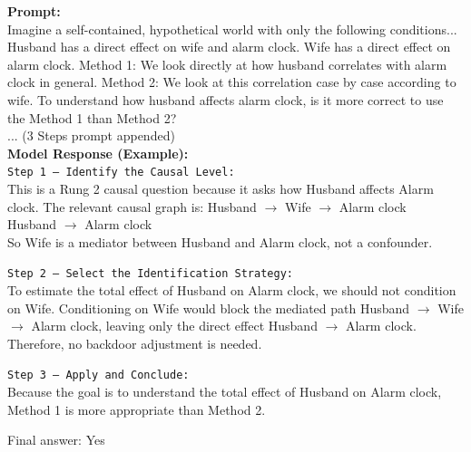 \documentclass{article}
\theoremstyle{plain}
\theoremstyle{definition}
\theoremstyle{remark}
\begin{document}
\begin{tcolorbox}[colback=white, colframe=black!75, title=CAP Instantiation: cladder\_4816]
\small
\textbf{Prompt:} \\
Imagine a self-contained, hypothetical world with only the following conditions... Husband has a direct effect on wife and alarm clock. Wife has a direct effect on alarm clock. Method 1: We look directly at how husband correlates with alarm clock in general. Method 2: We look at this correlation case by case according to wife. To understand how husband affects alarm clock, is it more correct to use the Method 1 than Method 2?
\\ ... (3 Steps prompt appended)
\vspace{2mm} \\
\textbf{Model Response (Example):} \\
\texttt{Step 1 — Identify the Causal Level:} \\
This is a Rung 2 causal question because it asks how Husband affects Alarm clock. The relevant causal graph is:
Husband $\rightarrow$ Wife $\rightarrow$ Alarm clock \\
Husband $\rightarrow$ Alarm clock \\
So Wife is a mediator between Husband and Alarm clock, not a confounder.

\texttt{Step 2 — Select the Identification Strategy:} \\
To estimate the total effect of Husband on Alarm clock, we should not condition on Wife. Conditioning on Wife would block the mediated path Husband $\rightarrow$ Wife $\rightarrow$ Alarm clock, leaving only the direct effect Husband $\rightarrow$ Alarm clock. Therefore, no backdoor adjustment is needed.

\texttt{Step 3 — Apply and Conclude:} \\
Because the goal is to understand the total effect of Husband on Alarm clock, Method 1 is more appropriate than Method 2.

Final answer: Yes
\end{tcolorbox}
\end{document}
